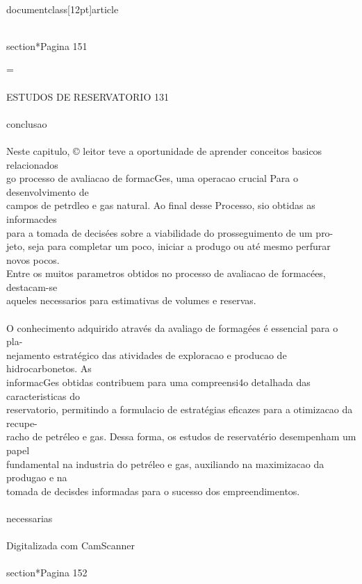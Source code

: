 \\documentclass[12pt]{article}
\begin{document}
\\section*{Pagina 151}

=\\
\\
ESTUDOS DE RESERVATORIO 131\\
\\
conclusao\\
\\
Neste capitulo, © leitor teve a oportunidade de aprender conceitos basicos relacionados\\
go processo de avaliacao de formacGes, uma operacao crucial Para o desenvolvimento de\\
campos de petrdleo e gas natural. Ao final desse Processo, sio obtidas as informacdes\\
para a tomada de decisées sobre a viabilidade do prosseguimento de um pro-\\
jeto, seja para completar um poco, iniciar a produgo ou até mesmo perfurar novos pocos.\\
Entre os muitos parametros obtidos no processo de avaliacao de formacées, destacam-se\\
aqueles necessarios para estimativas de volumes e reservas.\\
\\
O conhecimento adquirido através da avaliago de formagées é essencial para o pla-\\
nejamento estratégico das atividades de exploracao e producao de hidrocarbonetos. As\\
informacGes obtidas contribuem para uma compreensi4o detalhada das caracteristicas do\\
reservatorio, permitindo a formulacio de estratégias eficazes para a otimizacao da recupe-\\
racho de petréleo e gas. Dessa forma, os estudos de reservatério desempenham um papel\\
fundamental na industria do petréleo e gas, auxiliando na maximizacao da produgao e na\\
tomada de decisdes informadas para o sucesso dos empreendimentos.\\
\\
necessarias\\
\\
Digitalizada com CamScanner\\

\\section*{Pagina 152}
\end{document}
